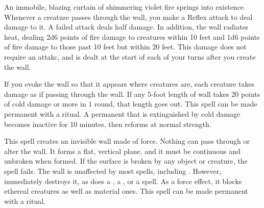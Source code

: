 \spelldur{\durshort}
\spelleffect An immobile, blazing curtain of shimmering violet fire springs into existence. Whenever a creature passes through the wall, you make a Reflex attack to deal damage to it. A failed attack deals half damage. In addition, the wall radiates heat, dealing 2d6 points of fire damage to creatures within 10 feet and 1d6 points of fire damage to those past 10 feet but within 20 feet. This damage does not require an attakc, and is dealt at the start of each of your turns after you create the wall.
\par If you evoke the wall so that it appears where creatures are, each creature takes damage as if passing through the wall. If any 5-foot length of wall takes 20 points of cold damage or more in 1 round, that length goes out.
\spellnotes This spell can be made permanent with a  ritual. A permanent  that is extinguished by cold damage becomes inactive for 10 minutes, then reforms at normal strength.

\spelldur{\durshort \dismissable}
\spelleffect This spell creates an invisible wall made of force. Nothing can pass through or alter the wall. It forms a flat, vertical plane, and it must be continuous and unbroken when formed. If the surface is broken by any object or creature, the spell fails.
\spellnotes The wall is unaffected by most spells, including . However,  immediately destroys it, as does a , a , or a  spell. As a force effect, it blocks ethereal creatures as well as material ones.
This spell can be made permanent with a  ritual.

